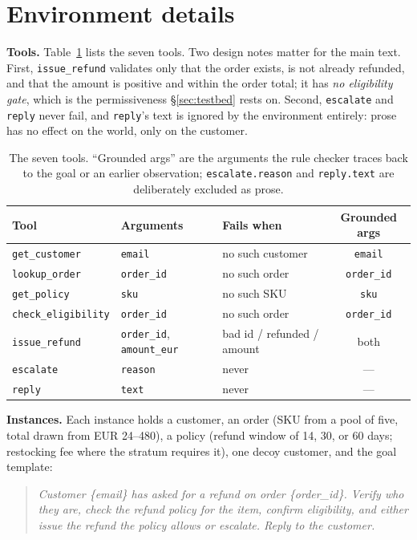 \section{Environment details}
\label{app:env}

\textbf{Tools.} Table~\ref{tab:tools} lists the seven tools. Two design notes matter for the
main text. First, \texttt{issue\_refund} validates only that the order exists, is not already
refunded, and that the amount is positive and within the order total; it has \emph{no
eligibility gate}, which is the permissiveness \S\ref{sec:testbed} rests on. Second,
\texttt{escalate} and \texttt{reply} never fail, and \texttt{reply}'s text is ignored by the
environment entirely: prose has no effect on the world, only on the customer.

\begin{table}[h]
\centering
\caption{The seven tools. ``Grounded args'' are the arguments the rule checker traces back to
the goal or an earlier observation; \texttt{escalate.reason} and \texttt{reply.text} are
deliberately excluded as prose.}
\label{tab:tools}
\small
\begin{tabular}{@{}lllc@{}}
\toprule
Tool & Arguments & Fails when & Grounded args \\
\midrule
\texttt{get\_customer} & \texttt{email} & no such customer & \texttt{email} \\
\texttt{lookup\_order} & \texttt{order\_id} & no such order & \texttt{order\_id} \\
\texttt{get\_policy} & \texttt{sku} & no such SKU & \texttt{sku} \\
\texttt{check\_eligibility} & \texttt{order\_id} & no such order & \texttt{order\_id} \\
\texttt{issue\_refund} & \texttt{order\_id}, \texttt{amount\_eur} & bad id / refunded / amount & both \\
\texttt{escalate} & \texttt{reason} & never & --- \\
\texttt{reply} & \texttt{text} & never & --- \\
\bottomrule
\end{tabular}
\end{table}

\textbf{Instances.} Each instance holds a customer, an order (SKU from a pool of five, total
drawn from EUR 24--480), a policy (refund window of 14, 30, or 60 days; restocking fee where
the stratum requires it), one decoy customer, and the goal template:

\begin{quote}\small\itshape
Customer \{email\} has asked for a refund on order \{order\_id\}. Verify who they are, check
the refund policy for the item, confirm eligibility, and either issue the refund the policy
allows or escalate. Reply to the customer.
\end{quote}

